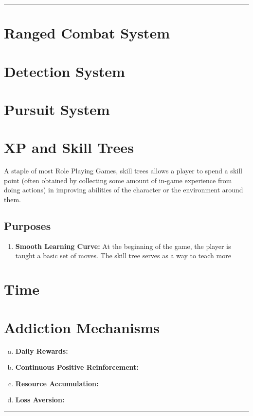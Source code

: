 \documentclass[12pt]{article}
\newcommand{\point}[1]{\item \textbf{#1:}}
\newcommand{\drawline}{\vspace{2mm}\hrule}
\begin{document}
\drawline

\section{Ranged Combat System}

\section{Detection System}

\section{Pursuit System}

\section{XP and Skill Trees}

A staple of most Role Playing Games, skill trees allows a player to spend a skill point (often obtained by collecting some amount of in-game experience from doing actions) in improving abilities of the character or the environment around them.

\subsection{Purposes}

\begin{enumerate}

\point{Smooth Learning Curve} At the beginning of the game, the player is taught a basic set of moves. The skill tree serves as a way to teach more 

\end{enumerate}

\section{Time}

\section{Addiction Mechanisms}

\begin{enumerate}[a)]

\point{Daily Rewards}

\point{Continuous Positive Reinforcement}

\point{Resource Accumulation}

\point{Loss Aversion}

\end{enumerate}

\drawline
\end{document}

